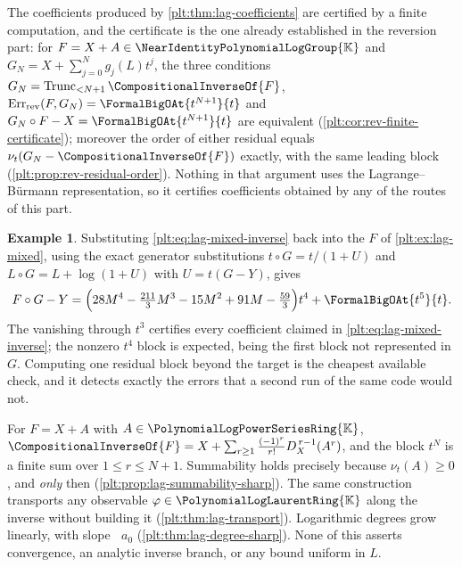 \documentclass[11pt,oneside]{article}
\theoremstyle{plain}
\theoremstyle{definition}
\newtheorem{example}[theorem]{Example}
\theoremstyle{remark}
\newcommand{\K}{\mathbb{K}}
\newcommand{\PLpow}{\PolynomialLogPowerSeriesRing{\K}}   %
\newcommand{\PLlau}{\PolynomialLogLaurentRing{\K}}       %
\newcommand{\Gnear}{\NearIdentityPolynomialLogGroup{\K}} %
\newcommand{\ordt}{\nu_{t}}                              %
\DeclareMathOperator{\degL}{deg_{L}}
\newcommand{\Trunc}[2]{\operatorname{Trunc}_{<#2}#1}     %
\newcommand{\DX}{D_{X}}                                  %
\newcommand{\compose}{\mathbin{\circ}}
\newcommand{\rev}[1]{\CompositionalInverseOf{#1}}
\newcommand{\RevErr}[2]{\operatorname{Err}_{\mathrm{rev}}\!\left(#1,#2\right)}
\begin{document}
The coefficients produced by \cref{plt:thm:lag-coefficients} are certified by
a finite computation, and the certificate is the one already established in
the reversion part: for \(F=X+A\in\Gnear\) and
\(G_N=X+\sum_{j=0}^{N}g_j(L)t^j\), the three conditions
\(G_N=\Trunc{\rev{F}}{N+1}\), \(\RevErr{F}{G_N}=\FormalBigOAt{t^{N+1}}{t}\)
and \(G_N\compose F-X=\FormalBigOAt{t^{N+1}}{t}\) are equivalent
(\cref{plt:cor:rev-finite-certificate}); moreover the order of either residual
equals \(\ordt(G_N-\rev{F})\) exactly, with the same leading block
(\cref{plt:prop:rev-residual-order}).  Nothing in that argument uses the
Lagrange--B\"urmann representation, so it certifies coefficients obtained by
any of the routes of this part.

\begin{example}
\label{plt:ex:lag-certificate-mixed}
Substituting \cref{plt:eq:lag-mixed-inverse} back into the \(F\) of
\cref{plt:ex:lag-mixed}, using the exact generator substitutions
\(t\compose G=t/(1+U)\) and \(L\compose G=L+\log(1+U)\) with \(U=t(G-Y)\),
gives
\[
  F\compose G-Y
  =\Bigl(28M^4-\tfrac{211}{3}M^3-15M^2+91M-\tfrac{59}{3}\Bigr)t^4
   +\FormalBigOAt{t^5}{t}.
\]
The vanishing through \(t^3\) certifies every coefficient claimed in
\cref{plt:eq:lag-mixed-inverse}; the nonzero \(t^4\) block is expected, being
the first block not represented in \(G\).  Computing one residual block beyond
the target is the cheapest available check, and it detects exactly the errors
that a second run of the same code would not.
\end{example}

\begin{summarybox}[title={What the formula does and does not say}]
For \(F=X+A\) with \(A\in\PLpow\),
\(\rev{F}=X+\sum_{r\ge1}\frac{(-1)^r}{r!}\DX^{\,r-1}(A^r)\), and the block
\(t^N\) is a finite sum over \(1\le r\le N+1\).  Summability holds precisely
because \(\ordt(A)\ge0\), and \emph{only} then
(\cref{plt:prop:lag-summability-sharp}).  The same construction transports any
observable \(\varphi\in\PLlau\) along the inverse without building it
(\cref{plt:thm:lag-transport}).  Logarithmic degrees grow linearly, with slope
\(\degL a_0\) (\cref{plt:thm:lag-degree-sharp}).  None of this asserts
convergence, an analytic inverse branch, or any bound uniform in \(L\).
\end{summarybox}
\end{document}
